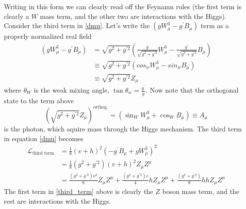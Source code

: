 \documentclass[11pt]{article}
\begin{document}
{Writing in this form we can clearly read off the Feynamn rules (the first term is clearly a $W$ mass term, and the other two are interactions with the Higgs). Consider the third term in \ref{dmu}. Let's write the $\left(g W_{\mu}^{3}-g^{\prime} B_{\mu}\right)$ term as a properly normalized real field
\begin{equation}
    \begin{aligned}
\left(g W_{\mu}^{3}-g^{\prime} B_{\mu}\right) &=\sqrt{g^{2}+g^{\prime 2}}\left(\frac{g}{\sqrt{g^{2}+g^{\prime 2}}} W_{\mu}^{3}-\frac{g^{\prime}}{\sqrt{g^{2}+g^{\prime 2}}} B_{\mu}\right) \\
& \equiv \sqrt{g^{2}+g^{\prime 2}}\left(cos_{w} W_{\mu}^{3}-sin_{w} B_{\mu}\right) \\
& \equiv \sqrt{g^{2}+g^{\prime 2}} Z_{\mu}
\end{aligned}
\end{equation}
where $\theta_W$ is the weak mixing angle, $\tan \theta_{w}=\frac{g^{\prime}}{g}$. Now note that the orthogonal state to the term above
\begin{equation}
   (\sqrt{g^{2}+g^{\prime 2}} Z_{\mu})^{\text{orthog.}} =\left(\sin_{W} W_{\mu}^{3}+\cos_{W} B_{\mu}\right) \equiv A_{\mu}
\end{equation}
is the photon, which aquire mass through the Higgs mechanism.
The third term in equation \ref{dmu} becomes
\begin{equation}
    \begin{aligned}
\mathcal{L}_{\text{third term}} & = \frac{1}{8}(v+h)^{2}\left(-g^{\prime} B_{\mu}+g W_{\mu}^{3}\right)^{2} \\
&=\frac{1}{8}\left(g^{2}+g^{\prime 2}\right)(v+h)^{2} Z_{\mu} Z^{\mu} \\
&=\frac{\left(g^{2}+g^{\prime 2}\right) v^{2}}{8} Z_{\mu} Z^{\mu}+\frac{\left(g^{2}+g^{\prime 2}\right) v}{4} h Z_{\mu} Z^{\mu}+\frac{\left(g^{2}+g^{\prime 2}\right)}{8} h h Z_{\mu} Z^{\mu}
\label{third_term}
\end{aligned}
\end{equation}
The first term in \ref{third_term} above is clearly the $Z$ boson mass term, and the rest are interactions with the Higgs.









}
\end{document}
